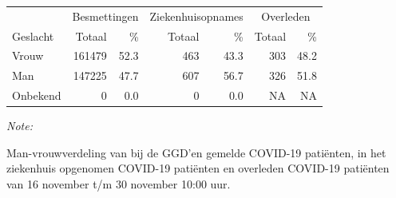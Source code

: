 \documentclass[
  english,
  man,floatsintext]{apa6}
\begin{document}
\newpage

\begin{table}
\centering\begingroup\fontsize{11}{13}\selectfont

\begin{threeparttable}
\begin{tabular}{lrrrrrr}
\toprule
\multicolumn{1}{c}{ } & \multicolumn{2}{c}{Besmettingen} & \multicolumn{2}{c}{Ziekenhuisopnames} & \multicolumn{2}{c}{Overleden} \\
\cmidrule(l{3pt}r{3pt}){2-3} \cmidrule(l{3pt}r{3pt}){4-5} \cmidrule(l{3pt}r{3pt}){6-7}
Geslacht & Totaal & \% & Totaal & \% & Totaal & \%\\
\midrule
Vrouw & 161479 & 52.3 & 463 & 43.3 & 303 & 48.2\\
Man & 147225 & 47.7 & 607 & 56.7 & 326 & 51.8\\
Onbekend & 0 & 0.0 & 0 & 0.0 & NA & NA\\
\bottomrule
\end{tabular}
\begin{tablenotes}
\item \textit{Note: } 
\item Man-vrouwverdeling van bij de GGD’en gemelde COVID-19 patiënten, in het ziekenhuis opgenomen COVID-19 patiënten en overleden COVID-19 patiënten van 16 november t/m 30 november 10:00 uur.
\end{tablenotes}
\end{threeparttable}
\endgroup{}
\end{table}
\newpage
\end{document}
